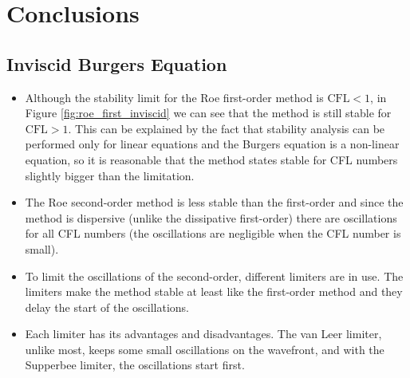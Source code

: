 \documentclass[11pt, a4paper]{article}
\begin{document}
\section{Conclusions}
\subsection{Inviscid Burgers Equation}
\begin{itemize}
    \item Although the stability limit for the Roe first-order method is $\mathrm{CFL}<1$, in Figure \ref{fig:roe_first_inviscid} we can see that the method is still stable for $\mathrm{CFL}>1$. This can be explained by the fact that stability analysis can be performed only for linear equations and the Burgers equation is a non-linear equation, so it is reasonable that the method states stable for CFL numbers slightly bigger than the limitation.
    \item The Roe second-order method is less stable than the first-order and since the method is dispersive (unlike the dissipative first-order) there are oscillations for all CFL numbers (the oscillations are negligible when the CFL number is small).
    \item To limit the oscillations of the second-order, different limiters are in use. The limiters make the method stable at least like the first-order method and they delay the start of the oscillations.
    \item Each limiter has its advantages and disadvantages.
    The van Leer limiter, unlike most, keeps some small oscillations on the wavefront, and with the Supperbee limiter, the oscillations start first.
\end{itemize}
\end{document}
